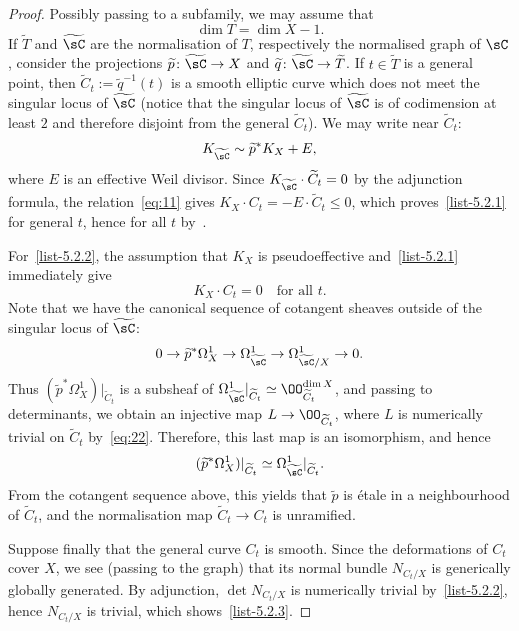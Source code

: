 \begin{proof}
Possibly passing to a subfamily, we may assume that
\[
\dim T = \dim X - 1.
\]
If $\widetilde{T}$ and $\widetilde{\sC}$ are the normalisation of $T$, respectively the normalised graph of $\sC$, consider the projections $\widetilde{p} \colon \widetilde {\sC} \to X$ and $\widetilde q\colon \widetilde {\sC} \to \widetilde{T}$. If $t \in \widetilde{T}$ is a general point, then $\widetilde {C}_t:=\widetilde{q}^{-1}(t)$ is a smooth elliptic curve which does not meet the singular locus of $\widetilde{\sC}$ (notice that the singular locus of $\widetilde {\sC}$ is of codimension at least $2$ and therefore disjoint from the general $\widetilde{C}_t$). We may write near $\widetilde{C}_t$:
\begin{equation}\label{eq:11}
K_{\widetilde{\sC}} \sim \widetilde{p}^*K_X + E,
\end{equation}
where $E$ is an effective Weil divisor. Since $K_{\widetilde{\sC}} \cdot \widetilde{C}_t = 0$ by the adjunction formula, the relation~\eqref{eq:11} gives $K_X\cdot C_t=-E\cdot\widetilde{C}_t\leq0$, which proves~\eqref{list-5.2.1} for general $t$, hence for all $t$ by~\cite[Proposition~I.3.12]{Kol96}.

For~\eqref{list-5.2.2}, the assumption that $K_X$ is pseudoeffective and~\eqref{list-5.2.1} immediately give
\begin{equation}\label{eq:22}
K_X \cdot C_t=0 \quad\text{for all }t.
\end{equation}
Note that we have the canonical sequence of cotangent sheaves outside of the singular locus of $\widetilde{\sC}$:
\[
0 \to \widetilde{p}^*\Omega^1_X \to \Omega^1_{\widetilde {\sC}} \to \Omega^1_{\widetilde {\sC}/X} \to 0.
\]
Thus $(\widetilde{p}^*\Omega^1_X)|_{\widetilde C_t}$ is a subsheaf of $\Omega^1_{\widetilde {\sC}}|_{\widetilde C_t} \simeq \OO_{\widetilde C_t}^{\dim X}$, and passing to determinants, we obtain an injective map $L\to \OO_{\widetilde C_t}$, where $L$ is numerically trivial on $\widetilde C_t$ by~\eqref{eq:22}. Therefore, this last map is an isomorphism, and hence
\[
(\widetilde p^*\Omega^1_X)|_{\widetilde C_t} \simeq \Omega^1_{\widetilde {\sC}}|_{\widetilde C_t}.
\]
From the cotangent sequence above, this yields that $\widetilde p$ is étale in a neighbourhood of $\widetilde C_t$, and the normalisation map $\widetilde C_t \to C_t$ is unramified.


Suppose finally that the general curve $C_t$ is smooth. Since the deformations of $C_t$ cover $X$, we see (passing to the graph) that its normal bundle $N_{C_t/X}$ is generically globally generated. By adjunction, $\det N_{C_t/X}$ is numerically trivial by~\eqref{list-5.2.2}, hence $N_{C_t/X}$ is trivial, which shows~\eqref{list-5.2.3}.
\end{proof}

